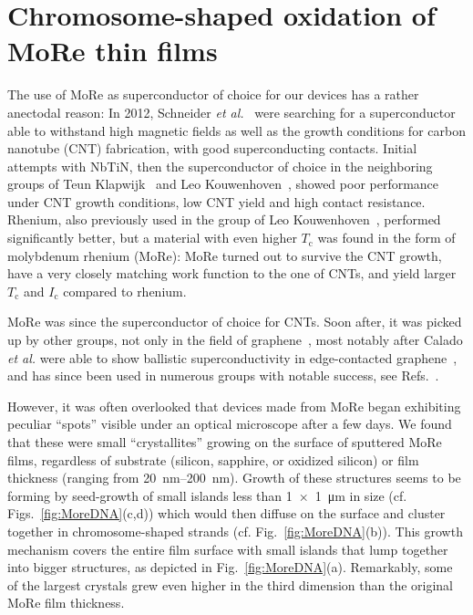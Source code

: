 \section{Chromosome-shaped oxidation of MoRe thin films}
\label{sec:more}

The use of MoRe as superconductor of choice for our devices has a rather anectodal reason:
%
In 2012, Schneider \textit{et al.}~\cite{schneiderCouplingCarbonNanotube2012,schneiderSuspendedCarbonNanotubes2014b} were searching for a superconductor able to withstand high magnetic fields as well as the growth conditions for carbon nanotube (CNT) fabrication, with good superconducting contacts.
%
Initial attempts with NbTiN, then the superconductor of choice in the neighboring groups of Teun Klapwijk~\cite{iosadSourceOptimizationMagnetron1999} and Leo Kouwenhoven~\cite{mourikSignaturesMajoranaFermions2012}, showed poor performance under CNT growth conditions, low CNT yield and high contact resistance.
%
Rhenium, also previously used in the group of Leo Kouwenhoven~\cite{keijzersJosephsonEffectsCarbon2012}, performed significantly better, but a material with even higher $T_\text{c}$ was found in the form of molybdenum rhenium (MoRe):
%
MoRe turned out to survive the CNT growth, have a very closely matching work function to the one of CNTs, and yield larger $T_\text{c}$ and $I_\text{c}$ compared to rhenium.

MoRe was since the superconductor of choice for CNTs.
%
Soon after, it was picked up by other groups, not only in the field of graphene~\cite{azizMolybdenumrheniumSuperconductingSuspended2014a}, most notably after Calado \textit{et al.} were able to show ballistic superconductivity in edge-contacted graphene~\cite{caladoBallisticJosephsonJunctions2015d}, and has since been used in numerous groups with notable success, see Refs.~\cite{singhMolybdenumrheniumAlloyBased2014,gotzCosputteredMoReThin2016,blienCarbonNanotubeGrowth2016a,draelosSupercurrentFlowMultiterminal2019,ametSupercurrentQuantumHall2016b,islandThicknessDependentInterlayer2016a,krollMagneticFieldCompatible2018}.


However, it was often overlooked that devices made from MoRe began exhibiting peculiar \enquote{spots} visible under an optical microscope after a few days.
% 
We found that these were small \enquote{crystallites} growing on the surface of sputtered MoRe films, regardless of substrate (silicon, sapphire, or oxidized silicon) or film thickness (ranging from \SIrange{20}{200}{\nano\meter}).
%
Growth of these structures seems to be forming by seed-growth of small islands less than \SI{1x1}{\micro\meter} in size (cf. Figs.~\ref{fig:MoreDNA}(c,d)) which would then diffuse on the surface and cluster together in chromosome-shaped strands (cf. Fig.~\ref{fig:MoreDNA}(b)).
%
This growth mechanism covers the entire film surface with small islands that lump together into bigger structures, as depicted in Fig.~\ref{fig:MoreDNA}(a).
%
Remarkably, some of the largest crystals grew even higher in the third dimension than the original MoRe film thickness.

